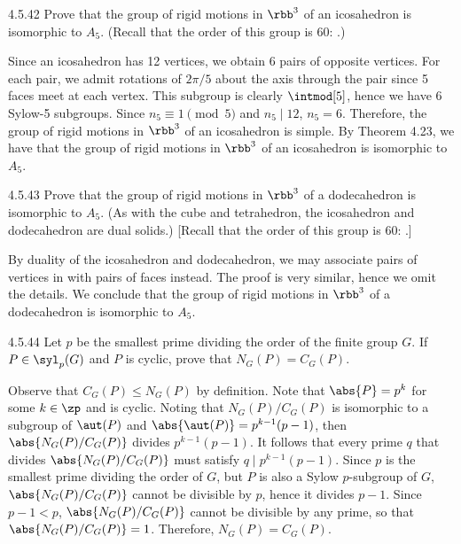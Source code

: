\begin{exercise}{4.5.42}
	Prove that the group of rigid motions in $\rbb^3$ of an icosahedron is isomorphic to $A_5$. (Recall that the order of this group is 60: .)
\end{exercise}

\begin{sol}
	Since an icosahedron has 12 vertices, we obtain 6 pairs of opposite vertices.
	For each pair, we admit rotations of $2\pi/5$ about the axis through the pair since 5 faces meet at each vertex.
	This subgroup is clearly $\intmod[5]$, hence we have 6 Sylow-5 subgroups.
	Since $n_5 \equiv 1 \pmod 5$ and $n_5 \mid 12$, $n_5 = 6$.
	Therefore, the group of rigid motions in $\rbb^3$ of an icosahedron is simple.
	By Theorem 4.23, we have that the group of rigid motions in $\rbb^3$ of an icosahedron is isomorphic to $A_5$.
\end{sol}

\begin{exercise}{4.5.43}
	Prove that the group of rigid motions in $\rbb^3$ of a dodecahedron is isomorphic to $A_5$. (As with the cube and tetrahedron, the icosahedron and dodecahedron are dual solids.) [Recall that the order of this group is 60: .]
\end{exercise}

\begin{sol}
	By duality of the icosahedron and dodecahedron, we may associate pairs of vertices in  with pairs of faces instead.
	The proof is very similar, hence we omit the details.
	We conclude that the group of rigid motions in $\rbb^3$ of a dodecahedron is isomorphic to $A_5$.
\end{sol}

\begin{exercise}{4.5.44}
	Let $p$ be the smallest prime dividing the order of the finite group $G$.
	If $P \in \syl_p(G)$ and $P$ is cyclic, prove that $N_G(P) = C_G(P)$.
\end{exercise}

\begin{sol}
	Observe that $C_G(P) \leq N_G(P)$ by definition.
	Note that $\abs{P} = p^k$ for some $k \in \zp$ and is cyclic.
	Noting that $N_G(P)/C_G(P)$ is isomorphic to a subgroup of $\aut(P)$ and $\abs{\aut(P)} = p^{k - 1}(p - 1)$, then $\abs{N_G(P)/C_G(P)}$ divides $p^{k - 1}(p - 1)$.
	It follows that every prime $q$ that divides $\abs{N_G(P)/C_G(P)}$ must satisfy $q \mid p^{k - 1}(p - 1)$.
	Since $p$ is the smallest prime dividing the order of $G$, but $P$ is also a Sylow $p$-subgroup of $G$, $\abs{N_G(P)/C_G(P)}$ cannot be divisible by $p$, hence it divides $p - 1$.
	Since $p - 1 < p$, $\abs{N_G(P)/C_G(P)}$ cannot be divisible by any prime, so that $\abs{N_G(P)/C_G(P)} = 1$.
	Therefore, $N_G(P) = C_G(P)$.
\end{sol}

